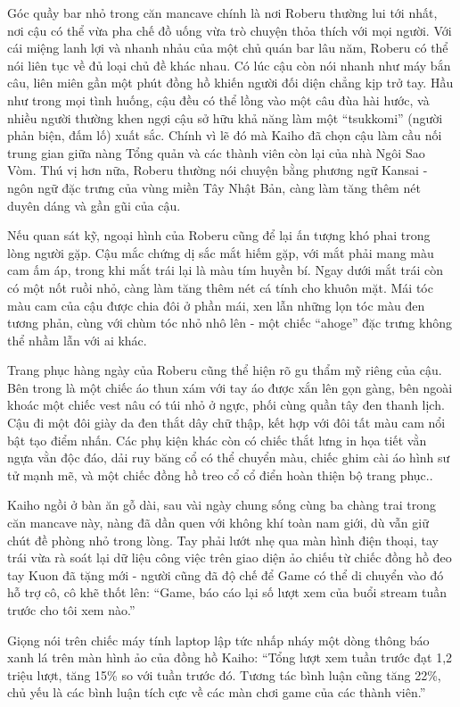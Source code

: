 \documentclass[../main.tex]{subfiles}
\begin{document}
Góc quầy bar nhỏ trong căn mancave chính là nơi Roberu thường lui tới nhất, nơi cậu có thể vừa pha chế đồ uống vừa trò chuyện thỏa thích với mọi người. Với cái miệng lanh lợi và nhanh nhảu của một chủ quán bar lâu năm, Roberu có thể nói liên tục về đủ loại chủ đề khác nhau. Có lúc cậu còn nói nhanh như máy bắn câu, liên miên gần một phút đồng hồ khiến người đối diện chẳng kịp trở tay. Hầu như trong mọi tình huống, cậu đều có thể lồng vào một câu đùa hài hước, và nhiều người thường khen ngợi cậu sở hữu khả năng làm một ``tsukkomi'' (người phản biện, đấm lố) xuất sắc. Chính vì lẽ đó mà Kaiho đã chọn cậu làm cầu nối trung gian giữa nàng Tổng quản và các thành viên còn lại của nhà Ngôi Sao Vòm. Thú vị hơn nữa, Roberu thường nói chuyện bằng phương ngữ Kansai - ngôn ngữ đặc trưng của vùng miền Tây Nhật Bản, càng làm tăng thêm nét duyên dáng và gần gũi của cậu.

Nếu quan sát kỹ, ngoại hình của Roberu cũng để lại ấn tượng khó phai trong lòng người gặp. Cậu mắc chứng dị sắc mắt hiếm gặp, với mắt phải mang màu cam ấm áp, trong khi mắt trái lại là màu tím huyền bí. Ngay dưới mắt trái còn có một nốt ruồi nhỏ, càng làm tăng thêm nét cá tính cho khuôn mặt. Mái tóc màu cam của cậu được chia đôi ở phần mái, xen lẫn những lọn tóc màu đen tương phản, cùng với chùm tóc nhỏ nhô lên - một chiếc ``ahoge'' đặc trưng không thể nhầm lẫn với ai khác.

Trang phục hàng ngày của Roberu cũng thể hiện rõ gu thẩm mỹ riêng của cậu. Bên trong là một chiếc áo thun xám với tay áo được xắn lên gọn gàng, bên ngoài khoác một chiếc vest nâu có túi nhỏ ở ngực, phối cùng quần tây đen thanh lịch. Cậu đi một đôi giày da đen thắt dây chữ thập, kết hợp với đôi tất màu cam nổi bật tạo điểm nhấn. Các phụ kiện khác còn có chiếc thắt lưng in họa tiết vằn ngựa vằn độc đáo, dải ruy băng cổ có thể chuyển màu, chiếc ghim cài áo hình sư tử mạnh mẽ, và một chiếc đồng hồ treo cổ cổ điển hoàn thiện bộ trang phục..

\chrint

Kaiho ngồi ở bàn ăn gỗ dài, sau vài ngày chung sống cùng ba chàng trai trong căn mancave này, nàng đã dần quen với không khí toàn nam giới, dù vẫn giữ chút đề phòng nhỏ trong lòng. Tay phải lướt nhẹ qua màn hình điện thoại, tay trái vừa rà soát lại dữ liệu công việc trên giao diện ảo chiếu từ chiếc đồng hồ đeo tay Kuon đã tặng mới - người cũng đã độ chế để Game có thể di chuyển vào đó hỗ trợ cô, cô khẽ thốt lên: ``Game, báo cáo lại số lượt xem của buổi stream tuần trước cho tôi xem nào.''

Giọng nói trên chiếc máy tính laptop lập tức nhấp nháy một dòng thông báo xanh lá trên màn hình ảo của đồng hồ Kaiho: ``Tổng lượt xem tuần trước đạt 1,2 triệu lượt, tăng 15\% so với tuần trước đó. Tương tác bình luận cũng tăng 22\%, chủ yếu là các bình luận tích cực về các màn chơi game của các thành viên.''
\end{document}
